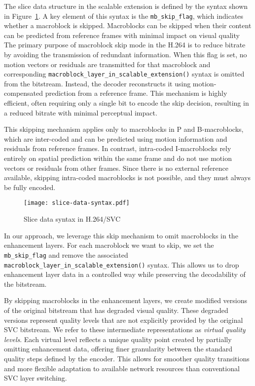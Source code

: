     The slice data structure in the scalable extension is defined by the syntax
    shown in  Figure~\ref{fig:slice-data-syntax}.  A key element of this syntax
    is the \texttt{mb\_skip\_flag}, which indicates whether a macroblock is
    skipped. Macroblocks can be skipped when their content can be
    predicted from reference frames with minimal impact on visual
    quality The primary purpose of macroblock skip mode in the H.264 is to
    reduce bitrate by avoiding the transmission of redundant information.  When
    this flag is set, no motion vectors or residuals are transmitted for that
    macroblock and corresponding
    \texttt{macroblock\_layer\_in\_scalable\_extension()} syntax is omitted from
    the bitstream. Instead, the decoder reconstructs it using motion-compensated
    prediction from a reference frame. This mechanism is highly efficient, often
    requiring only a single bit to encode the skip decision, resulting in a
    reduced bitrate with minimal perceptual impact.


    This skipping mechanism applies only to macroblocks in P and B-macroblocks, which
    are inter-coded and can be predicted using motion information and residuals
    from reference frames. In contrast, intra-coded I-macroblocks rely
    entirely on spatial prediction within the same frame and do not use motion
    vectors or residuals from other frames. Since there is no external reference
    available, skipping intra-coded macroblocks is not possible, and they must
    always be fully encoded.

    \begin{figure}[H]
        \centering
        \texttt{[image: slice-data-syntax.pdf]} 
        \caption{Slice data syntax in H.264/SVC}
        \label{fig:slice-data-syntax}
    \end{figure}

    In our approach, we leverage this skip mechanism to omit
    macroblocks in the enhancement layers. For each macroblock we want to skip,
    we set the \texttt{mb\_skip\_flag} and remove the associated
    \texttt{macroblock\_layer\_in\_scalable\_extension()} syntax. This allows us
    to drop enhancement layer data in a controlled way while preserving
    the decodability of the bitstream.
    

    By skipping macroblocks in the enhancement layers, we create
    modified versions of the original bitstream that has degraded visual quality.
    These degraded versions represent
    quality levels that are not explicitly provided by the original SVC bitstream.
    We refer to these intermediate representations as \textit{virtual quality
    levels}. Each virtual level reflects a unique quality point created by partially
    omitting enhancement data, offering finer granularity between the standard
    quality steps defined by the encoder. This allows for smoother quality
    transitions and more flexible adaptation to available network resources than
    conventional SVC layer switching.



